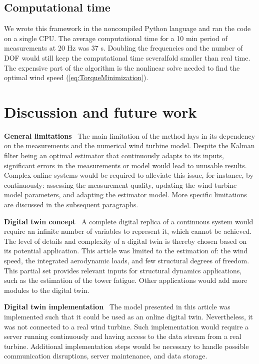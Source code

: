\documentclass[wes, manuscript]{copernicus}
\newcommand\runinhead[1]{\par\vspace{0.3cm}\noindent\textbf{#1}\ }%
\begin{document}
\subsection{Computational time}
We wrote this framework in the noncompiled Python language and ran the code on a single CPU.
The average computational time for a 10 \unit{min} period of measurements at 20 \unit{Hz} was 37 \unit{s}. Doubling the frequencies and the number of DOF would still keep the computational time severalfold smaller than real time. The expensive part of the algorithm is the nonlinear solve needed to find the optimal wind speed (\autoref{eq:TorqueMinimization}). 






\section{Discussion and future work}
\label{sec:discussions}

\runinhead{General limitations} 
The main limitation of the method lays in its dependency on the measurements and the numerical wind turbine model. Despite the Kalman filter being an optimal estimator that continuously adapts to its inputs, significant errors in the measurements or model would lead to unusable results. Complex online systems would be required to alleviate this issue, for instance, by continuously: assessing the measurement quality, updating the wind turbine model parameters, and adapting the estimator model.
More specific limitations are discussed in the subsequent paragraphs.
    
\runinhead{Digital twin concept} 
A complete digital replica of a continuous system would require an infinite number of variables to represent it, which cannot be achieved. The level of details and complexity of a digital twin is thereby chosen based on its potential application. This article was limited to the estimation of: the wind speed, the integrated aerodynamic loads, and few structural degrees of freedom. This partial set provides relevant inputs for structural dynamics applications, such as the estimation of the tower fatigue. Other applications would add more modules to the digital twin.


\runinhead{Digital twin implementation} 
The model presented in this article was implemented such that it could be used as an online digital twin. Nevertheless, it was not connected to a real wind turbine. Such implementation would require a server running continuously and having access to the data stream from a real turbine. Additional implementation steps would be necessary to handle possible communication disruptions, server maintenance, and data storage.
\end{document}
